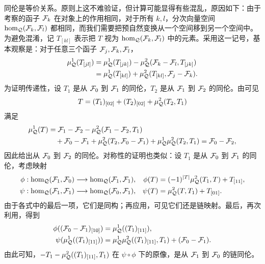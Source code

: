 同伦是等价关系。原则上这不难验证，但计算可能显得有些混乱，原因如下：由于考察的函子 $\mathcal F_k$ 在对象上的作用相同，对于所有 $k,l$，分次向量空间 $\hom_{\mathcal Q}(\mathcal F_k,\mathcal F_l)$ 都相同，而我们需要把预自然变换从一个空间移到另一个空间中。为避免混淆，记 $T_{[kl]}$ 表示把 $T$ 视为 $\hom_{\mathcal Q}(\mathcal F_k,\mathcal F_l)$ 中的元素。采用这一记号，基本观察是：对于任意三个函子 $\mathcal F_j,\mathcal F_k,\mathcal F_l$，
\begin{equation}\label{eq:1.15}
\begin{aligned}
\mu^1_{\mathcal Q}(T_{[jl]})
&=\mu^1_{\mathcal Q}(T_{[jk]})-\mu^2_{\mathcal Q}(\mathcal F_k-\mathcal F_l,T_{[jk]})\\
&=\mu^1_{\mathcal Q}(T_{[kl]})+\mu^2_{\mathcal Q}(T_{[kl]},\mathcal F_j-\mathcal F_k).
\end{aligned}
\end{equation}
为证明传递性，设 $T_1$ 是从 $\mathcal F_0$ 到 $\mathcal F_1$ 的同伦，$T_2$ 是从 $\mathcal F_1$ 到 $\mathcal F_2$ 的同伦。由可见
\begin{equation}\label{eq:1.16}
T=(T_1)_{[02]}+(T_2)_{[02]}+\mu^2_{\mathcal Q}(T_2,T_1)
\end{equation}
满足
\[
\begin{aligned}
\mu^1_{\mathcal Q}(T)
&=\mathcal F_1-\mathcal F_2-\mu^2_{\mathcal Q}(\mathcal F_1-\mathcal F_2,T_1)\\
&\quad+\mathcal F_0-\mathcal F_1+\mu^2_{\mathcal Q}(T_2,\mathcal F_0-\mathcal F_1)+\mu^1_{\mathcal Q}\mu^2_{\mathcal Q}(T_2,T_1)
=\mathcal F_0-\mathcal F_2,
\end{aligned}
\]
因此给出从 $\mathcal F_0$ 到 $\mathcal F_2$ 的同伦。对称性的证明也类似：设 $T_1$ 是从 $\mathcal F_0$ 到 $\mathcal F_1$ 的同伦，考虑映射
\begin{equation}\label{eq:1.17}
\begin{aligned}
\phi &: \hom_{\mathcal Q}(\mathcal F_1,\mathcal F_0)\longrightarrow\hom_{\mathcal Q}(\mathcal F_1,\mathcal F_1),
&\phi(T)&=(-1)^{|T|}\mu^2_{\mathcal Q}(T_1,T)+T_{[11]},\\
\psi &: \hom_{\mathcal Q}(\mathcal F_1,\mathcal F_1)\longrightarrow\hom_{\mathcal Q}(\mathcal F_0,\mathcal F_1),
&\psi(T)&=\mu^2_{\mathcal Q}(T,T_1)+T_{[01]}.
\end{aligned}
\end{equation}
由于各式中的最后一项，它们是同构；再应用，可见它们还是链映射。最后，再次利用，得到
\[
\begin{aligned}
\phi((\mathcal F_0-\mathcal F_1)_{[10]})&=\mu^1_{\mathcal Q}((T_1)_{[11]}),\\
\psi(\mu^1_{\mathcal Q}((T_1)_{[11]}))&=\mu^1_{\mathcal Q}\mu^2_{\mathcal Q}((T_1)_{[11]},T_1)+(\mathcal F_0-\mathcal F_1).
\end{aligned}
\]
由此可知，$-T_1-\mu^2_{\mathcal Q}((T_1)_{[11]},T_1)$ 在 $\psi\circ\phi$ 下的原像，是从 $\mathcal F_1$ 到 $\mathcal F_0$ 的链同伦。


